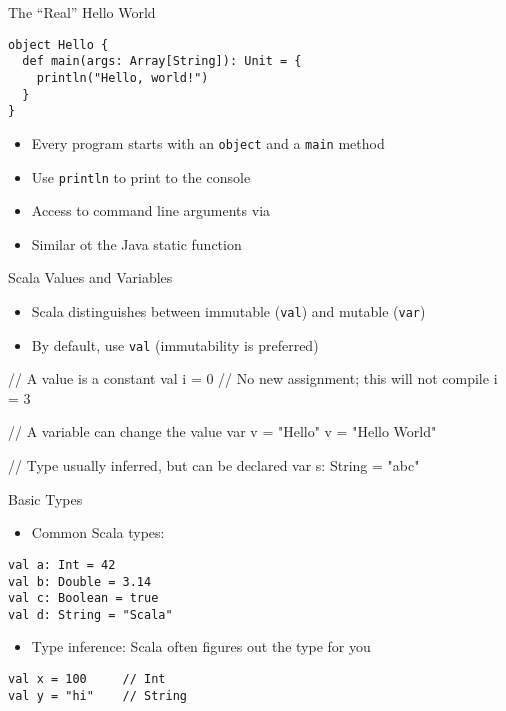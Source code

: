 \begin{frame}[fragile]{The ``Real'' Hello World}

\begin{verbatim}
object Hello {
  def main(args: Array[String]): Unit = {
    println("Hello, world!")
  }
}
\end{verbatim}

\begin{itemize}
    \item Every program starts with an \texttt{object} and a \texttt{main} method
    \item Use \texttt{println} to print to the console
    \item Access to command line arguments via 
    \item Similar ot the Java static  function
\end{itemize}
\end{frame}

\begin{frame}[fragile]{Scala Values and Variables}
\begin{itemize}
    \item Scala distinguishes between immutable (\texttt{val}) and mutable (\texttt{var})
    \item By default, use \texttt{val} (immutability is preferred)
\end{itemize}
\begin{chisel}
// A value is a constant
val i = 0
// No new assignment; this will not compile
i = 3

// A variable can change the value
var v = "Hello"
v = "Hello World"

// Type usually inferred, but can be declared
var s: String = "abc"
\end{chisel}
\end{frame}

\begin{frame}[fragile]{Basic Types}
\begin{itemize}
    \item Common Scala types:
\end{itemize}

\begin{verbatim}
val a: Int = 42
val b: Double = 3.14
val c: Boolean = true
val d: String = "Scala"
\end{verbatim}

\begin{itemize}
    \item Type inference: Scala often figures out the type for you
\end{itemize}

\begin{verbatim}
val x = 100     // Int
val y = "hi"    // String
\end{verbatim}
\end{frame}

